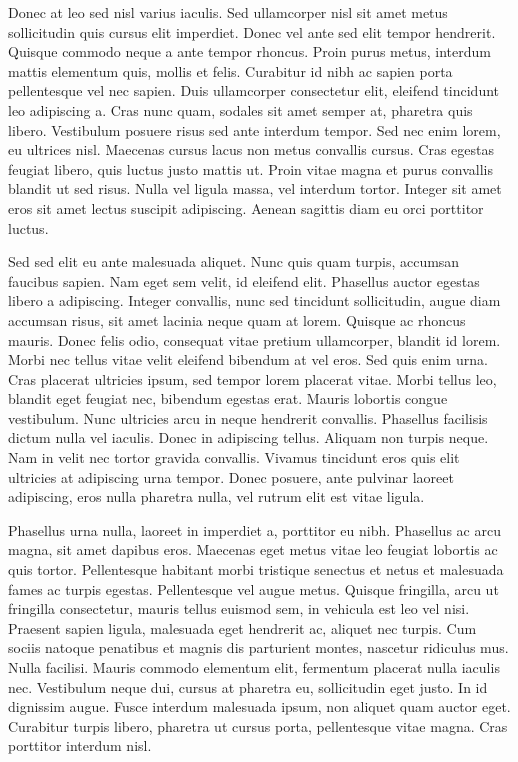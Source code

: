 \documentclass[bsc, classic, a4paper]{ufbathesis}
\begin{document}
Donec at leo sed nisl varius iaculis. Sed ullamcorper nisl sit amet metus sollicitudin quis cursus elit imperdiet. Donec vel ante sed elit tempor hendrerit. Quisque commodo neque a ante tempor rhoncus. Proin purus metus, interdum mattis elementum quis, mollis et felis. Curabitur id nibh ac sapien porta pellentesque vel nec sapien. Duis ullamcorper consectetur elit, eleifend tincidunt leo adipiscing a. Cras nunc quam, sodales sit amet semper at, pharetra quis libero. Vestibulum posuere risus sed ante interdum tempor. Sed nec enim lorem, eu ultrices nisl. Maecenas cursus lacus non metus convallis cursus. Cras egestas feugiat libero, quis luctus justo mattis ut. Proin vitae magna et purus convallis blandit ut sed risus. Nulla vel ligula massa, vel interdum tortor. Integer sit amet eros sit amet lectus suscipit adipiscing. Aenean sagittis diam eu orci porttitor luctus.

Sed sed elit eu ante malesuada aliquet. Nunc quis quam turpis, accumsan faucibus sapien. Nam eget sem velit, id eleifend elit. Phasellus auctor egestas libero a adipiscing. Integer convallis, nunc sed tincidunt sollicitudin, augue diam accumsan risus, sit amet lacinia neque quam at lorem. Quisque ac rhoncus mauris. Donec felis odio, consequat vitae pretium ullamcorper, blandit id lorem. Morbi nec tellus vitae velit eleifend bibendum at vel eros. Sed quis enim urna. Cras placerat ultricies ipsum, sed tempor lorem placerat vitae. Morbi tellus leo, blandit eget feugiat nec, bibendum egestas erat. Mauris lobortis congue vestibulum. Nunc ultricies arcu in neque hendrerit convallis. Phasellus facilisis dictum nulla vel iaculis. Donec in adipiscing tellus. Aliquam non turpis neque. Nam in velit nec tortor gravida convallis. Vivamus tincidunt eros quis elit ultricies at adipiscing urna tempor. Donec posuere, ante pulvinar laoreet adipiscing, eros nulla pharetra nulla, vel rutrum elit est vitae ligula.

Phasellus urna nulla, laoreet in imperdiet a, porttitor eu nibh. Phasellus ac arcu magna, sit amet dapibus eros. Maecenas eget metus vitae leo feugiat lobortis ac quis tortor. Pellentesque habitant morbi tristique senectus et netus et malesuada fames ac turpis egestas. Pellentesque vel augue metus. Quisque fringilla, arcu ut fringilla consectetur, mauris tellus euismod sem, in vehicula est leo vel nisi. Praesent sapien ligula, malesuada eget hendrerit ac, aliquet nec turpis. Cum sociis natoque penatibus et magnis dis parturient montes, nascetur ridiculus mus. Nulla facilisi. Mauris commodo elementum elit, fermentum placerat nulla iaculis nec. Vestibulum neque dui, cursus at pharetra eu, sollicitudin eget justo. In id dignissim augue. Fusce interdum malesuada ipsum, non aliquet quam auctor eget. Curabitur turpis libero, pharetra ut cursus porta, pellentesque vitae magna. Cras porttitor interdum nisl.
\end{document}
